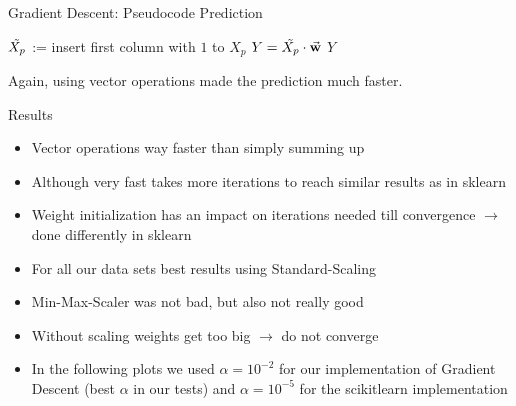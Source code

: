 \documentclass[10pt]{beamer}
\newcommand{\w}{\vec{\textbf{w}}}
\begin{document}
    \begin{frame}[fragile]{Gradient Descent: Pseudocode Prediction}
        \begin{algorithm}[H]
            \caption{GD-Prediction($\w$, $X_p$)}
			\begin{algorithmic}[1]
			    \State $\Tilde{X_p}$ := insert first column with $1$ to $X_p$
			    \State $Y = \Tilde{X_p} \cdot \w$
			    \State \Return $Y$
			\end{algorithmic}
		\end{algorithm}
		Again, using vector operations made the prediction much faster.
    \end{frame}
    
    \begin{frame}{Results}
        \begin{itemize}
            \item Vector operations way faster than simply summing up
            \item Although very fast takes more iterations to reach similar results as in sklearn
            \item Weight initialization has an impact on iterations needed till convergence $\rightarrow$ done differently in sklearn
            
            \item For all our data sets best results using Standard-Scaling
            \item Min-Max-Scaler was not bad, but also not really good
            \item Without scaling weights get too big $\rightarrow$ do not converge
            
            \item In the following plots we used $\alpha=10^{-2}$ for our implementation of Gradient Descent (best $\alpha$ in our tests) and $\alpha=10^{-5}$ for the scikitlearn implementation
        \end{itemize}
    \end{frame}
    
\end{document}
